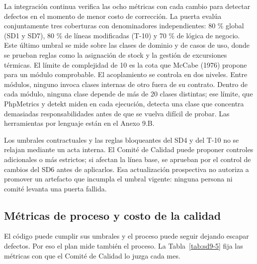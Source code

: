 La integración continua verifica las ocho métricas con cada cambio para detectar defectos en el momento de menor costo de corrección. La puerta evalúa conjuntamente tres coberturas con denominadores independientes: 80 \% global (SD1 y SD7), 80 \% de líneas modificadas (T-10) y 70 \% de lógica de negocio. Este último umbral se mide sobre las clases de dominio y de casos de uso, donde se prueban reglas como la asignación de stock y la gestión de excursiones térmicas. El límite de complejidad de 10 es la cota que McCabe (1976) propone para un módulo comprobable. El acoplamiento se controla en dos niveles. Entre módulos, ninguno invoca clases internas de otro fuera de su contrato. Dentro de cada módulo, ninguna clase depende de más de 20 clases distintas; ese límite, que PhpMetrics y detekt miden en cada ejecución, detecta una clase que concentra demasiadas responsabilidades antes de que se vuelva difícil de probar. Las herramientas por lenguaje están en el Anexo 9.B.

Los umbrales contractuales y las reglas bloqueantes del SD4 y del T-10 no se relajan mediante un acta interna. El Comité de Calidad puede proponer controles adicionales o más estrictos; si afectan la línea base, se aprueban por el control de cambios del SD6 antes de aplicarlos. Esa actualización prospectiva no autoriza a promover un artefacto que incumpla el umbral vigente: ninguna persona ni comité levanta una puerta fallida.

\subsection{Métricas de proceso y costo de la calidad}

El código puede cumplir sus umbrales y el proceso puede seguir dejando escapar defectos. Por eso el plan mide también el proceso. La Tabla~\ref{tab:sd9-5} fija las métricas con que el Comité de Calidad lo juzga cada mes.

